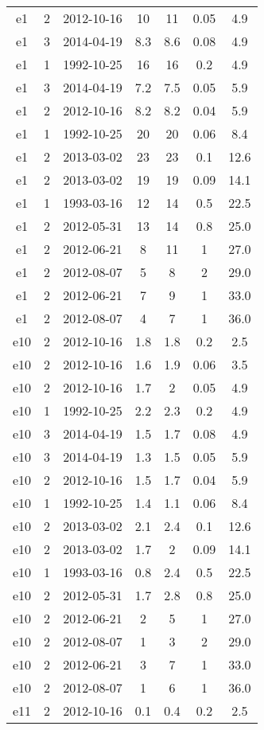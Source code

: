 \begin{longtable}{ccccccc}
e1 & 2 & 2012-10-16 & 10 & 11 & 0.05 & 4.9 \\
e1 & 3 & 2014-04-19 & 8.3 & 8.6 & 0.08 & 4.9 \\
e1 & 1 & 1992-10-25 & 16 & 16 & 0.2 & 4.9 \\
e1 & 3 & 2014-04-19 & 7.2 & 7.5 & 0.05 & 5.9 \\
e1 & 2 & 2012-10-16 & 8.2 & 8.2 & 0.04 & 5.9 \\
e1 & 1 & 1992-10-25 & 20 & 20 & 0.06 & 8.4 \\
e1 & 2 & 2013-03-02 & 23 & 23 & 0.1 & 12.6 \\
e1 & 2 & 2013-03-02 & 19 & 19 & 0.09 & 14.1 \\
e1 & 1 & 1993-03-16 & 12 & 14 & 0.5 & 22.5 \\
e1 & 2 & 2012-05-31 & 13 & 14 & 0.8 & 25.0 \\
e1 & 2 & 2012-06-21 & 8 & 11 & 1 & 27.0 \\
e1 & 2 & 2012-08-07 & 5 & 8 & 2 & 29.0 \\
e1 & 2 & 2012-06-21 & 7 & 9 & 1 & 33.0 \\
e1 & 2 & 2012-08-07 & 4 & 7 & 1 & 36.0 \\
e10 & 2 & 2012-10-16 & 1.8 & 1.8 & 0.2 & 2.5 \\
e10 & 2 & 2012-10-16 & 1.6 & 1.9 & 0.06 & 3.5 \\
e10 & 2 & 2012-10-16 & 1.7 & 2 & 0.05 & 4.9 \\
e10 & 1 & 1992-10-25 & 2.2 & 2.3 & 0.2 & 4.9 \\
e10 & 3 & 2014-04-19 & 1.5 & 1.7 & 0.08 & 4.9 \\
e10 & 3 & 2014-04-19 & 1.3 & 1.5 & 0.05 & 5.9 \\
e10 & 2 & 2012-10-16 & 1.5 & 1.7 & 0.04 & 5.9 \\
e10 & 1 & 1992-10-25 & 1.4 & 1.1 & 0.06 & 8.4 \\
e10 & 2 & 2013-03-02 & 2.1 & 2.4 & 0.1 & 12.6 \\
e10 & 2 & 2013-03-02 & 1.7 & 2 & 0.09 & 14.1 \\
e10 & 1 & 1993-03-16 & 0.8 & 2.4 & 0.5 & 22.5 \\
e10 & 2 & 2012-05-31 & 1.7 & 2.8 & 0.8 & 25.0 \\
e10 & 2 & 2012-06-21 & 2 & 5 & 1 & 27.0 \\
e10 & 2 & 2012-08-07 & 1 & 3 & 2 & 29.0 \\
e10 & 2 & 2012-06-21 & 3 & 7 & 1 & 33.0 \\
e10 & 2 & 2012-08-07 & 1 & 6 & 1 & 36.0 \\
e11 & 2 & 2012-10-16 & 0.1 & 0.4 & 0.2 & 2.5 \\

\end{longtable}
